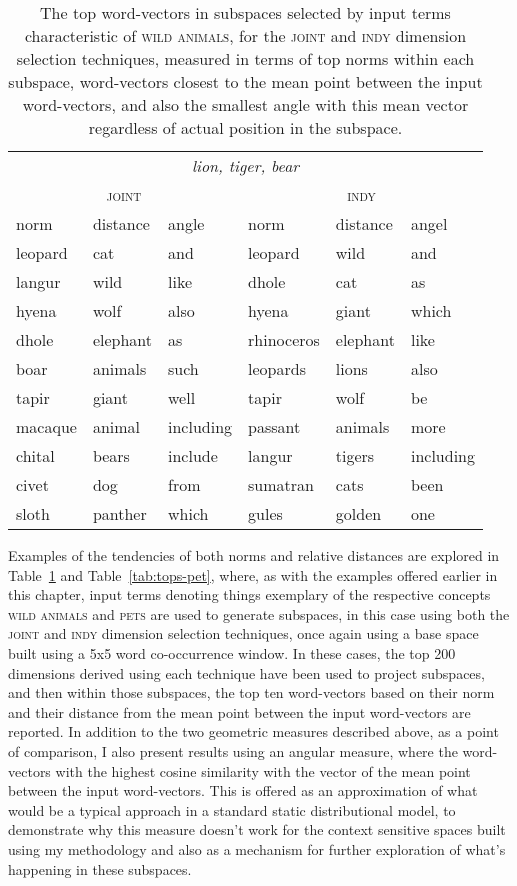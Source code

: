 \begin{table}
\centering
\begin{tabular}{lll|lll}
\hline
\multicolumn{6}{c}{\emph{lion, tiger, bear}} \\
\multicolumn{3}{c}{\textsc{joint}} & \multicolumn{3}{c}{\textsc{indy}} \\
\hline
norm & distance & angle & norm & distance & angel \\
\hline
leopard & cat & and & leopard & wild & and \\
langur & wild & like & dhole & cat & as \\
hyena & wolf & also & hyena & giant & which \\
dhole & elephant & as & rhinoceros & elephant & like \\
boar & animals & such & leopards & lions & also \\
tapir & giant & well & tapir & wolf & be \\
macaque & animal & including & passant & animals & more \\
chital & bears & include & langur & tigers & including \\
civet & dog & from & sumatran & cats & been \\
sloth & panther & which & gules & golden & one \\
\hline
\end{tabular}
\caption{The top word-vectors in subspaces selected by input terms characteristic of \textsc{wild animals}, for the \textsc{joint} and \textsc{indy} dimension selection techniques, measured in terms of top norms within each subspace, word-vectors closest to the mean point between the input word-vectors, and also the smallest angle with this mean vector regardless of actual position in the subspace.}
\label{tab:tops-wild}
\end{table}

Examples of the tendencies of both norms and relative distances are explored in Table~\ref{tab:tops-wild} and Table~\ref{tab:tops-pet}, where, as with the examples offered earlier in this chapter, input terms denoting things exemplary of the respective concepts \textsc{wild animals} and \textsc{pets} are used to generate subspaces, in this case using both the \textsc{joint} and \textsc{indy} dimension selection techniques, once again using a base space built using a 5x5 word co-occurrence window.  In these cases, the top 200 dimensions derived using each technique have been used to project subspaces, and then within those subspaces, the top ten word-vectors based on their norm and their distance from the mean point between the input word-vectors are reported.  In addition to the two geometric measures described above, as a point of comparison, I also present results using an angular measure, where the word-vectors with the highest cosine similarity with the vector of the mean point between the input word-vectors.  This is offered as an approximation of what would be a typical approach in a standard static distributional model, to demonstrate why this measure doesn't work for the context sensitive spaces built using my methodology and also as a mechanism for further exploration of what's happening in these subspaces.

